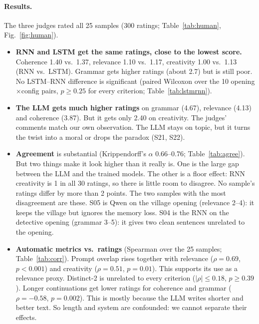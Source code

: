 \documentclass[11pt,a4paper]{article}
\begin{document}
\paragraph{Results.} The three judges rated all 25 samples (300 ratings; Table~\ref{tab:human},
Fig.~\ref{fig:human}).
\begin{itemize}
\item \textbf{RNN and LSTM get the same ratings, close to the lowest score.} Coherence 1.40 vs.\ 1.37,
  relevance 1.10 vs.\ 1.17, creativity 1.00 vs.\ 1.13 (RNN vs.\ LSTM). Grammar gets higher ratings
  (about 2.7) but is still poor. No LSTM--RNN difference is significant (paired Wilcoxon over the 10
  opening$\times$config pairs, $p\geq0.25$ for every criterion; Table~\ref{tab:lstmrnn}).
\item \textbf{The LLM gets much higher ratings} on grammar (4.67), relevance (4.13) and coherence
  (3.87). But it gets only 2.40 on creativity. The judges' comments match our own observation. The
  LLM stays on topic, but it turns the twist into a moral or drops the paradox (S21, S22).
\item \textbf{Agreement} is substantial (Krippendorff's $\alpha$ 0.66--0.76; Table~\ref{tab:agree}).
  But two things make it look higher than it really is. One is the large gap between the LLM and the
  trained models. The other is a floor effect: RNN creativity is 1 in all 30 ratings, so there is
  little room to disagree. No sample's ratings differ by more than 2 points. The two samples with the
  most disagreement are these. S05 is Qwen on the village opening (relevance 2--4): it keeps
  the village but ignores the memory loss. S04 is the RNN on the detective opening (grammar 3--5): it
  gives two clean sentences unrelated to the opening.
\item \textbf{Automatic metrics vs.\ ratings} (Spearman over the 25 samples; Table~\ref{tab:corr}).
  Prompt overlap rises together with relevance ($\rho=0.69$, $p<0.001$) and creativity ($\rho=0.51$,
  $p=0.01$). This supports its use as a relevance proxy. Distinct-2 is unrelated to every criterion
  ($|\rho|\leq0.18$, $p\geq0.39$). Longer continuations get lower ratings for coherence and grammar
  ($\rho=-0.58$, $p=0.002$). This is mostly because the LLM writes shorter and better text. So length
  and system are confounded: we cannot separate their effects.
\end{itemize}
\end{document}
